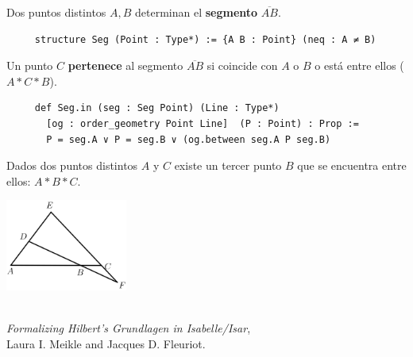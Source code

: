 \documentclass[t, aspectratio=169]{beamer}
\begin{document}
\begin{frame}[fragile]
	\begin{defin*}
		Dos puntos distintos $A, B$ determinan el \textbf{segmento} $\overline{AB}$.
	\end{defin*}
	\begin{lstlisting}
     structure Seg (Point : Type*) := {A B : Point} (neq : A ≠ B)
    \end{lstlisting}

	\pause

	\begin{defin*}
		Un punto $C$ \textbf{pertenece} al segmento $\overline{AB}$
		si coincide con $A$ o $B$ o está entre ellos ($A * C * B$).
	\end{defin*}
	\begin{lstlisting}
     def Seg.in (seg : Seg Point) (Line : Type*) 
       [og : order_geometry Point Line]  (P : Point) : Prop := 
       P = seg.A ∨ P = seg.B ∨ (og.between seg.A P seg.B)
    \end{lstlisting}
\end{frame}

\begin{frame}[fragile]

	\setcounter{tma}{2}
	\begin{tma}
		Dados dos puntos distintos $A$ y $C$ existe un tercer punto $B$ que se
		encuentra entre ellos: $A * B * C$.
	\end{tma}
	\vspace{1em}\pause
	\centerline{\includegraphics[width=4cm]{./imgs/teorema3.png}}\\
	\vspace{1em}
	\textit{Formalizing Hilbert’s Grundlagen in Isabelle/Isar},\\
	Laura I. Meikle and Jacques D. Fleuriot.\\
\end{frame}
\end{document}
